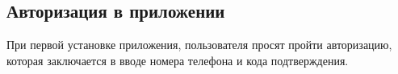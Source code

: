 \subsection{Авторизация в приложении}
\label{sec:usage:auth}

При первой установке приложения, пользователя просят пройти авторизацию, которая заключается в вводе номера телефона и кода подтверждения.


